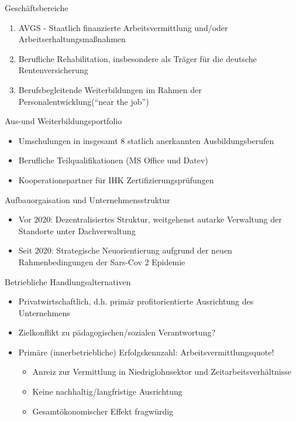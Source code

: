 \documentclass[
  10pt,
  ignorenonframetext,
]{beamer}
\providecommand{\tightlist}{%
  \setlength{\itemsep}{0pt}\setlength{\parskip}{0pt}}
\begin{document}
\begin{frame}{Geschäftsbereiche}
\protect\hypertarget{geschuxe4ftsbereiche}{}
\begin{enumerate}
\tightlist
\item
  AVGS - Staatlich finanzierte Arbeitsvermittlung und/oder
  Arbeitserhaltungsmaßnahmen
\item
  Berufliche Rehabilitation, insbesondere als Träger für die deutsche
  Rentenversicherung
\item
  Berufsbegleitende Weiterbildungen im Rahmen der
  Personalentwicklung(``near the job'')
\end{enumerate}
\end{frame}

\begin{frame}{Aus-und Weiterbildungsportfolio}
\protect\hypertarget{aus-und-weiterbildungsportfolio}{}
\begin{itemize}
\tightlist
\item
  Umschulungen in insgesamt 8 statlich anerkannten Ausbildungsberufen
\item
  Berufliche Teilqualifikationen (MS Office und Datev)
\item
  Kooperationspartner für IHK Zertifizierungsprüfungen
\end{itemize}
\end{frame}

\begin{frame}{Aufbauorgaisation und Unternehmensstruktur}
\protect\hypertarget{aufbauorgaisation-und-unternehmensstruktur}{}
\begin{itemize}
\tightlist
\item
  Vor 2020: Dezentralisiertes Struktur, weitgehenst autarke Verwaltung
  der Standorte unter Dachverwaltung
\item
  Seit 2020: Strategische Neuorientierung aufgrund der neuen
  Rahmenbedingungen der Sars-Cov 2 Epidemie
\end{itemize}
\end{frame}

\begin{frame}{Betriebliche Handlungsalternativen}
\protect\hypertarget{betriebliche-handlungsalternativen}{}
\begin{itemize}
\tightlist
\item
  Privatwirtschaftlich, d.h. primär profitorientierte Ausrichtung des
  Unternehmens
\item
  Zielkonflikt zu pädagogischen/sozialen Verantwortung?
\item
  Primäre (innerbetriebliche) Erfolgskennzahl: Arbeitsvermittlungsquote!

  \begin{itemize}
  \tightlist
  \item
    Anreiz zur Vermittlung in Niedriglohnsektor und
    Zeitarbeitsverhältnisse
  \item
    Keine nachhaltig/langfristige Ausrichtung
  \item
    Gesamtökonomischer Effekt fragwürdig
  \end{itemize}
\end{itemize}
\end{frame}
\end{document}
